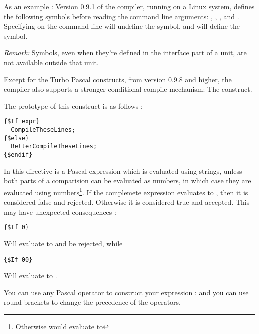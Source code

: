 \documentclass{report}
\begin{document}
As an example : Version 0.9.1 of the compiler, running on a Linux system,
defines the following symbols before reading the command line arguments:
, , ,  and .
Specifying  on the command-line will undefine the 
symbol, and will define the  symbol.

{\em Remark: } Symbols, even when they're defined in the interface part of
a unit, are not available outside that unit.


Except for the Turbo Pascal constructs, from version 0.9.8 and higher,
the \fpc compiler also supports a stronger conditional compile mechanism:
The  construct.

The prototype of this construct is as follows :
\begin{verbatim}
{$If expr}
  CompileTheseLines;
{$else}
  BetterCompileTheseLines;
{$endif}
\end{verbatim}
In this directive  is a Pascal expression which is evaluated using
strings, unless both parts of a comparision can be evaluated as numbers,
in which case they are evaluated using numbers\footnote{Otherwise
 would evaluate to }.
If the complemete expression evaluates to , then it is considered
false and rejected. Otherwise it is considered true and accepted. This may
have unexpected consequences :
\begin{verbatim}
{$If 0}
\end{verbatim}
Will evaluate to  and be rejected, while
\begin{verbatim}
{$If 00}
\end{verbatim}
Will evaluate to .

You can use any Pascal operator to construct your expression :  and you can use round brackets to change the
precedence of the operators.
\end{document}
